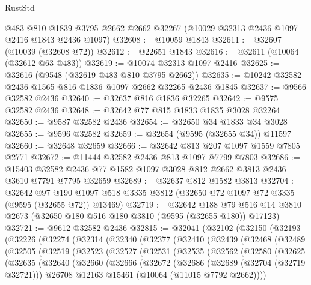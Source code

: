 \begin{lexlean}{RustStd}
\begin{coremodule}
    @483
    @810
    @1839
    @3795
    @2662
    @2662
    @32267
    (@10029 @32313 @2436 @1097 @2416 @1843 @2436 @1097)
@32608 := @10059 @1843
@32611 := @32607 (@10039 (@32608 @72))
@32612 := @22651 @1843
@32616 := @32611 (@10064 (@32612 @63 @483))
@32619 := @10074 @32313 @1097 @2416
@32625 := @32616 (@9548 (@32619 @483 @810 @3795 @2662))
@32635 := @10242 @32582 @2436 @1565 @816 @1836 @1097 @2662 @32265 @2436 @1845
@32637 := @9566 @32582 @2436
@32640 := @32637 @816 @1836 @32265
@32642 := @9575 @32582 @2436
@32648 := @32642 @77 @815 @1833 @1835 @3028 @32264
@32650 := @9587 @32582 @2436
@32654 := @32650 @34 @1833 @34 @3028
@32655 := @9596 @32582
@32659 := @32654 (@9595 (@32655 @34)) @11597
@32660 := @32648 @32659
@32666 := @32642 @813 @207 @1097 @1559 @7805 @2771
@32672 := @11444 @32582 @2436 @813 @1097 @7799 @7803
@32686 := @15403 @32582 @2436 @77 @1582 @1097 @3028 @812 @2662 @3813 @2436 @3610 @7791 @7795 @32659
@32689 := @32637 @812 @1582 @3813
@32704 := @32642
    @97
    @190
    @1097
    @518
    @3335
    @3812
    (@32650 @72 @1097 @72 @3335 (@9595 (@32655 @72)) @13469)
@32719 := @32642
    @188
    @79
    @516
    @14
    @3810
    @2673
    (@32650 @180 @516 @180 @3810 (@9595 (@32655 @180)) @17123)
@32721 := @9612 @32582 @2436
@32815 := @32041
    (@32102
      (@32150
        (@32193
          (@32226
            (@32274
              (@32314
                (@32340
                  (@32377
                    (@32410
                      (@32439
                        (@32468
                          (@32489
                            (@32505
                              (@32519
                                (@32523
                                  (@32527
                                    (@32531
                                      (@32535
                                        (@32562
                                          (@32580
                                            (@32625
                                              (@32635
                                                (@32640
                                                  (@32660
                                                    (@32666
                                                      (@32672
                                                        (@32686
                                                          (@32689 (@32704 (@32719 @32721)))
                                                          @26708
                                                          @12163
                                                          @15461
                                                          (@10064 (@11015 @7792 @2662))))

\end{coremodule}
\end{lexlean}
